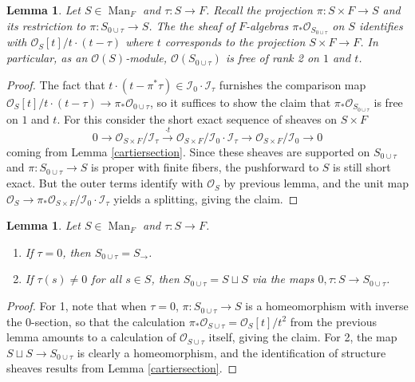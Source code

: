 \documentclass[12pt]{article}
\newtheorem{lemma}[theorem]{Lemma}
\begin{document}
\begin{lemma}\label{quadraticalgebra}
Let $S\in\operatorname{Man}_F$ and $\tau:S\rightarrow F$.  Recall the projection $\pi:S\times F\rightarrow S$ and its restriction to $\pi:S_{0\cup \tau}\rightarrow S$.  The the sheaf of $F$-algebras $\pi_\ast \mathcal{O}_{S_{0\cup \tau}}$ on $S$ identifies with $\mathcal{O}_S[t]/t\cdot (t-\tau)$ where $t$ corresponds to the projection $S\times F\rightarrow F$.  In particular, as an $\mathcal{O}(S)$-module, $\mathcal{O}(S_{0\cup \tau})$ is free of rank 2 on $1$ and $t$.
\end{lemma}
\begin{proof}
The fact that $t\cdot (t-\pi^\ast \tau)\in \mathcal{I}_0\cdot\mathcal{I}_\tau$ furnishes the comparison map $\mathcal{O}_S[t]/t\cdot (t-\tau)\rightarrow \pi_\ast \mathcal{O}_{0\cup \tau}$, so it suffices to show the claim that $\pi_\ast \mathcal{O}_{S_{0\cup\tau}}$ is free on $1$ and $t$.  For this consider the short exact sequence of sheaves on $S\times F$ 
$$0\rightarrow \mathcal{O}_{S\times F}/\mathcal{I}_\tau\overset{\cdot t}{\rightarrow} \mathcal{O}_{S\times F}/\mathcal{I}_0\cdot\mathcal{I}_\tau\rightarrow\mathcal{O}_{S\times F}/\mathcal{I}_0\rightarrow 0$$
coming from Lemma \ref{cartiersection}.  Since these sheaves are supported on $S_{0\cup \tau}$ and $\pi:S_{0\cup \tau}\rightarrow S$ is proper with finite fibers, the pushforward to $S$ is still short exact.  But the outer terms identify with $\mathcal{O}_S$ by previous lemma, and the unit map $\mathcal{O}_S\rightarrow \pi_\ast \mathcal{O}_{S\times F}/\mathcal{I}_0\cdot\mathcal{I}_\tau$ yields a splitting, giving the claim.
\end{proof}

\begin{lemma}\label{specialcasedef}
Let $S\in\operatorname{Man}_F$ and $\tau:S\rightarrow F$.
\begin{enumerate}
\item If $\tau=0$, then $S_{0\cup \tau}=S_{\rightarrow}$.
\item If $\tau(s)\neq 0$ for all $s\in S$, then $S_{0\cup \tau}=S\sqcup S$ via the maps $0,\tau:S\rightarrow S_{0\cup \tau}$.
\end{enumerate}
\end{lemma}
\begin{proof}
For 1, note that when $\tau=0$, $\pi:S_{0\cup\tau}\rightarrow S$ is a homeomorphism with inverse the $0$-section, so that the calculation $\pi_\ast\mathcal{O}_{S\cup \tau}=\mathcal{O}_S[t]/t^2$ from the previous lemma amounts to a calculation of $\mathcal{O}_{S\cup \tau}$ itself, giving the claim.  For 2, the map $S\sqcup S\rightarrow S_{0\cup \tau}$ is clearly a homeomorphism, and the identification of structure sheaves results from Lemma \ref{cartiersection}.
\end{proof}
\end{document}
